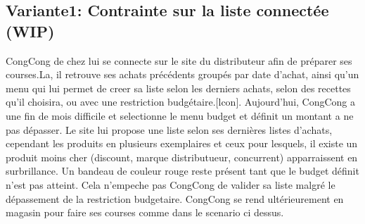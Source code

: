 \subsection{Variante1: Contrainte sur la liste connectée (WIP)}
CongCong de chez lui se connecte sur le site du distributeur afin de préparer ses courses.La, il retrouve ses achats précédents groupés par date d'achat, ainsi qu'un menu qui lui permet de creer sa liste selon les derniers achats, selon des recettes qu'il choisira, ou avec une restriction budgétaire.[lcon]. Aujourd'hui, CongCong a une fin de mois difficile et selectionne le menu budget et définit un montant a ne pas dépasser.
Le site lui propose une liste selon ses dernières listes d'achats, cependant les produits en plusieurs exemplaires et ceux pour lesquels, il existe un produit moins cher (discount, marque distributueur, concurrent) apparraissent en surbrillance. Un bandeau de couleur rouge reste présent tant que le budget définit n'est pas atteint. Cela n'empeche pas CongCong de valider sa liste malgré le dépassement de la restriction budgetaire.
CongCong se rend ultérieurement en magasin pour faire ses courses comme dans le scenario ci dessus.
